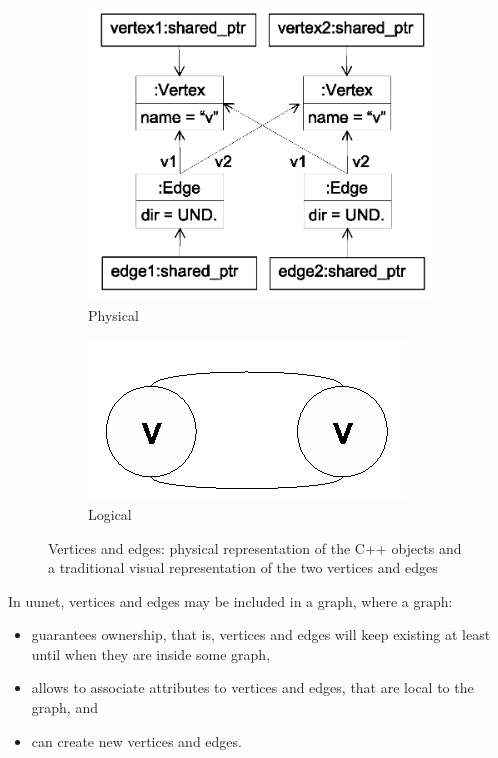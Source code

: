 \begin{figure}
  \centering
\begin{subfigure}{.7\textwidth}
  \centering
  \includegraphics[width=.8\linewidth]{figs/vertices_edges_cpp.eps}
  \caption{Physical}
  \label{fig:vertices_edges-physical}
\end{subfigure}
\begin{subfigure}{.2\textwidth}
  \centering
  \includegraphics[width=.8\linewidth]{figs/vertices_edges_logical.eps}
  \caption{Logical}
  \label{fig:vertices_edges_logical}
\end{subfigure}
\caption{Vertices and edges: physical representation of the C++ objects and a traditional visual representation of the two vertices and edges}
\label{fig:vertices_edges}
\end{figure}

In uunet, vertices and edges may be included in a graph, where a graph:
\begin{itemize}
    \item guarantees ownership, that is, vertices and edges will keep existing at least until when they are inside some graph,
    \item allows to associate attributes to vertices and edges, that are local to the graph, and
    \item can create new vertices and edges.
\end{itemize}

